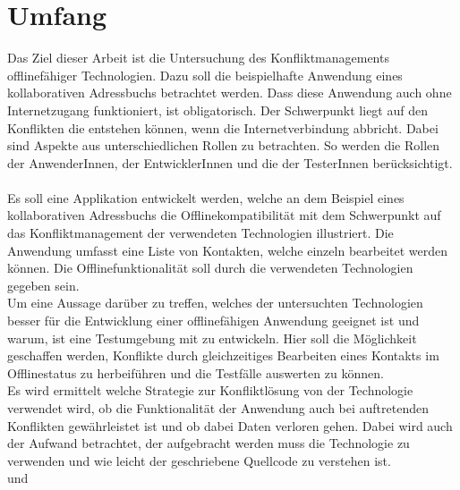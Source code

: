 \section{Umfang}
Das Ziel dieser Arbeit ist die Untersuchung des Konfliktmanagements offlinefähiger Technologien. Dazu soll die beispielhafte Anwendung eines kollaborativen Adressbuchs betrachtet werden. Dass diese Anwendung auch ohne Internetzugang funktioniert, ist obligatorisch.
Der Schwerpunkt liegt auf den Konflikten die entstehen können, wenn die Internetverbindung abbricht. Dabei sind Aspekte aus unterschiedlichen Rollen zu betrachten. So werden die Rollen der AnwenderInnen, der EntwicklerInnen und die der TesterInnen berücksichtigt.\\\\
Es soll eine Applikation entwickelt werden, welche an dem Beispiel eines kollaborativen Adressbuchs die Offlinekompatibilität mit dem Schwerpunkt auf das Konfliktmanagement der verwendeten Technologien illustriert.  Die Anwendung umfasst eine Liste von Kontakten, welche einzeln bearbeitet werden können. Die Offlinefunktionalität soll durch die verwendeten Technologien gegeben sein.\\
Um eine Aussage darüber zu treffen, welches der untersuchten Technologien besser für die Entwicklung einer offlinefähigen Anwendung geeignet ist und warum, ist eine Testumgebung mit zu entwickeln. Hier soll die Möglichkeit geschaffen werden, Konflikte durch gleichzeitiges Bearbeiten eines Kontakts im Offlinestatus zu herbeiführen und die Testfälle auswerten zu können.\\
Es wird ermittelt welche Strategie zur Konfliktlösung von der Technologie verwendet wird, ob die Funktionalität der Anwendung auch bei auftretenden Konflikten gewährleistet ist und ob dabei Daten verloren gehen.
Dabei wird auch der Aufwand betrachtet, der aufgebracht werden muss die Technologie zu verwenden und wie leicht der geschriebene Quellcode zu verstehen ist.\\
 und 